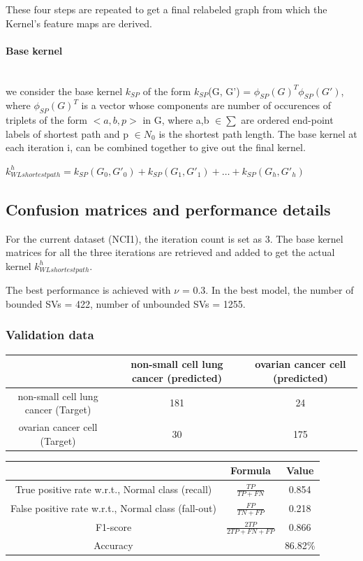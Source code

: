 \documentclass[fleqn]{article}
\newcommand{\myparagraph}[1]{\paragraph{#1}\mbox{}\\}
\begin{document}
These four steps are repeated to get a final relabeled graph from which the Kernel's feature maps are derived.

\myparagraph{Base kernel}

we consider the base kernel $k_{SP}$ of the form $k_{SP}$(G, G') = $\phi_{SP}(G)^T\phi_{SP}(G')$, where $\phi_{SP}(G)^T$ is a vector whose components are number of occurences of triplets of the form
$<a, b, p>$ in G, where a,b $\in \sum$ are ordered end-point labels of shortest path and  p $\in N_0 $ is the shortest path length.  
The base kernel at each iteration i, can be combined together to give out the final kernel.

$k_{WLshortestpath}^{h} = k_{SP}(G_0, G'_0) + k_{SP}(G_1, G'_1) + \dots + k_{SP}(G_h, G'_h)$  

\subsection{Confusion matrices and performance details}

For the current dataset (NCI1), the iteration count is set as 3. The base kernel matrices for all the three iterations are retrieved and 
added to get the actual kernel $k_{WLshortestpath}^{h}$.

The best performance is achieved with $\nu$ = 0.3. In the best model, the number of bounded SVs = 422, number of unbounded SVs = 1255.

\subsubsection{Validation data}

\begin{center}
  \begin{longtable}{ c | c | c  }
	\multicolumn{1}{c}{ } & 
	\multicolumn{1}{c}{non-small cell lung cancer (predicted)} & 
	\multicolumn{1}{c}{ovarian cancer cell (predicted)} \\
    \hline
    non-small cell lung cancer (Target)& 181 & 24 \\ \hline
    ovarian cancer cell (Target)&  30 & 175 \\ \hline
  \end{longtable}
\end{center}    

\begin{center}
  \begin{longtable}{ c | c | c  }
  	\multicolumn{1}{c}{ } & 
	\multicolumn{1}{c}{Formula} & 
	\multicolumn{1}{c}{Value} \\\hline
	True positive rate w.r.t., Normal class (recall)  & $\frac{TP}{TP + FN}$ & 0.854 \\\hline
	False positive rate w.r.t., Normal class (fall-out)  & $\frac{FP}{TN + FP}$ & 0.218\\\hline
	F1-score & $\frac{2TP}{2TP + FN + FP}$ & 0.866\\\hline
	Accuracy  & & 86.82\%\\\hline
  \end{longtable}
\end{center} 
\end{document}
